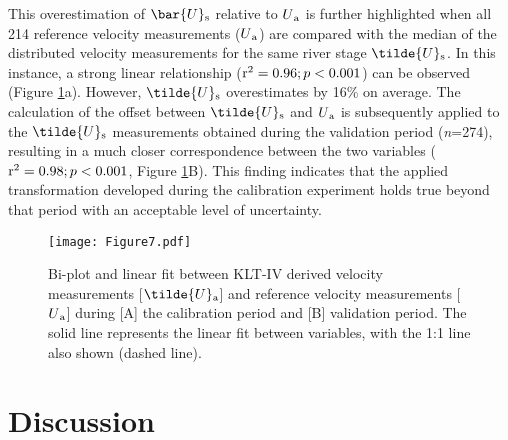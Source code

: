 \documentclass[hess, manuscript]{copernicus} %
\begin{document}
This overestimation of $\bar{U}\textsubscript{s}$ relative to $U\textsubscript{a}$ is further highlighted when all 214 reference velocity measurements ($U\textsubscript{a}$) are compared with the median of the distributed velocity measurements for the same river stage $\tilde{U}\textsubscript{s}$. In this instance, a strong linear relationship ($\textnormal{r\textsuperscript{2}} = 0.96; p < 0.001$) can be observed (Figure \ref{Figure7}a). However, $\tilde{U}\textsubscript{s}$ overestimates by 16\% on average. The calculation of the offset between $\tilde{U}\textsubscript{s}$ and $U\textsubscript{a}$ is subsequently applied to the $\tilde{U}\textsubscript{s}$ measurements obtained during the validation period (\textit{n}=274), resulting in a much closer correspondence between the two variables ($\textnormal{r\textsuperscript{2}} = 0.98; p < 0.001$, Figure \ref{Figure7}B). This finding indicates that the applied transformation developed during the calibration experiment holds true beyond that period with an acceptable level of uncertainty.

\begin{figure}[!htb]
\centering 
\texttt{[image: Figure7.pdf]}
\caption{Bi-plot and linear fit between KLT-IV derived velocity measurements [$\tilde{U}\textsubscript{a}$] and reference velocity measurements [$U\textsubscript{a}$] during [A] the calibration period and [B] validation period. The solid line represents the linear fit between variables, with the 1:1 line also shown (dashed line).}
\label{Figure7} 
\end{figure}



\section{Discussion}
\end{document}
